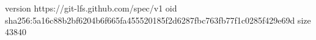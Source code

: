version https://git-lfs.github.com/spec/v1
oid sha256:5a16c88b2bf6204b6f665fa455520185f2d6287fbc763fb77f1c0285f429e69d
size 43840
